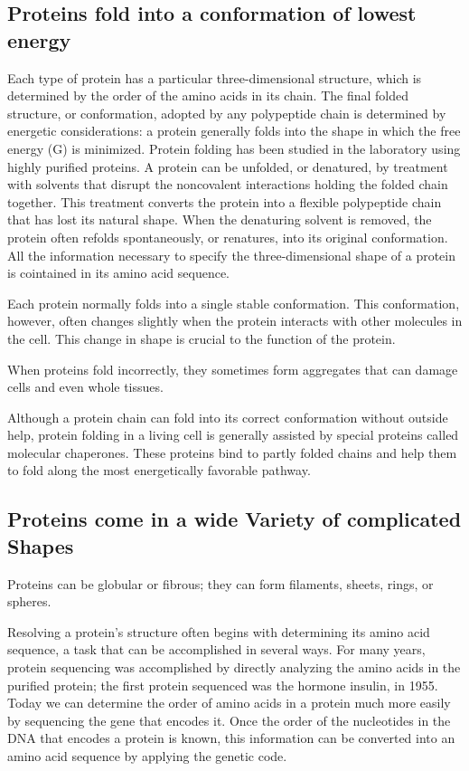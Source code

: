 \subsection{Proteins fold into a conformation of lowest energy}

Each type of protein has a particular three-dimensional structure, which
is determined by the order of the amino acids in its chain. The final folded
structure, or conformation, adopted by any polypeptide chain is determined
by energetic considerations: a protein generally folds into the
shape in which the free energy (G) is minimized. Protein folding
has been studied in the laboratory using highly purified proteins. A
protein can be unfolded, or denatured, by treatment with solvents that
disrupt the noncovalent interactions holding the folded chain together.
This treatment converts the protein into a flexible polypeptide chain that
has lost its natural shape. When the denaturing solvent is removed, the
protein often refolds spontaneously, or renatures, into its original conformation.
All the information necessary to specify the three-dimensional shape of a protein
is cointained in its amino acid sequence.

Each protein normally folds into a single stable conformation. This conformation,
however, often changes slightly when the protein interacts
with other molecules in the cell. This change in shape is crucial to the
function of the protein.

When proteins fold incorrectly, they sometimes form aggregates that can
damage cells and even whole tissues.

Although a protein chain can fold into its correct conformation without
outside help, protein folding in a living cell is generally assisted by special
proteins called molecular chaperones. These proteins bind to partly folded
chains and help them to fold along the most energetically favorable pathway.

\subsection{Proteins come in a wide Variety of complicated Shapes}

Proteins can be globular or fibrous; they can form filaments, sheets,
rings, or spheres.

Resolving a protein’s structure often begins with determining its amino
acid sequence, a task that can be accomplished in several ways. For
many years, protein sequencing was accomplished by directly analyzing
the amino acids in the purified protein; the first protein sequenced
was the hormone insulin, in 1955. Today we can determine the order of
amino acids in a protein much more easily by sequencing the gene that
encodes it. Once the order of the nucleotides
in the DNA that encodes a protein is known, this information can be
converted into an amino acid sequence by applying the genetic code.

